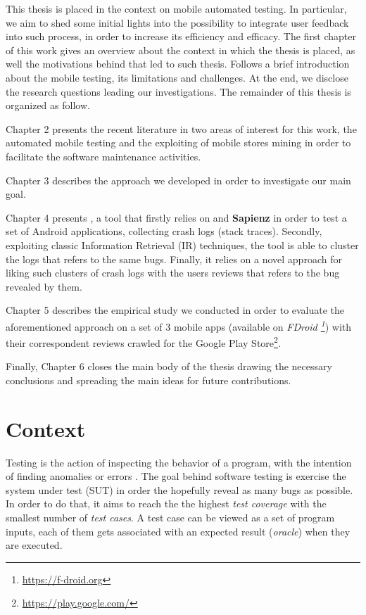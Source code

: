 This thesis is placed in the context on mobile automated testing. In particular, we aim to shed some initial lights into the possibility to integrate user feedback into such process, in order to increase its efficiency and efficacy.
The first chapter of this work gives an overview about the context in which the thesis is placed, as well the motivations behind that led to such thesis. Follows a brief introduction about the mobile testing, its limitations and challenges. At the end, we disclose the research questions leading our investigations. 
The remainder of this thesis is organized as follow. 

Chapter 2 presents the recent literature in two areas of interest for this work, \ie the automated mobile testing and the exploiting of mobile stores mining in order to facilitate the software maintenance activities.

Chapter 3 describes the approach we developed in order to investigate our main goal.

Chapter 4 presents \toolname, a tool that firstly relies on \monkey and \textbf{Sapienz} in order to test a set of Android applications, collecting crash logs (\ie stack traces). Secondly, exploiting classic Information Retrieval (IR) techniques, the tool is able to cluster the logs that refers to the same bugs. Finally, it relies on a novel approach for liking such clusters of crash logs with the users reviews that refers to the bug revealed by them. 

Chapter 5 describes the empirical study we conducted in order to evaluate the aforementioned approach on a set of 3 mobile apps (available on \textit{FDroid \footnote{\url{https://f-droid.org}}}) with their correspondent reviews crawled for the Google Play Store\footnote{\url{https://play.google.com/}}. 

Finally, Chapter 6 closes the main body of the thesis drawing the necessary conclusions and spreading the main ideas for future contributions.


\section{Context}
Testing is the action of inspecting the behavior of a program, with the intention of finding anomalies or errors \cite{testing}.
The goal behind software testing is exercise the system under test (SUT) in order the hopefully reveal as many bugs as possible. In order to do that, it aims to reach the the highest \textit{test coverage} with the smallest number of \textit{test cases}. A test case can be viewed as a set of program inputs, each of them gets associated with an expected result (\ie \textit{oracle}) when they are executed. 

